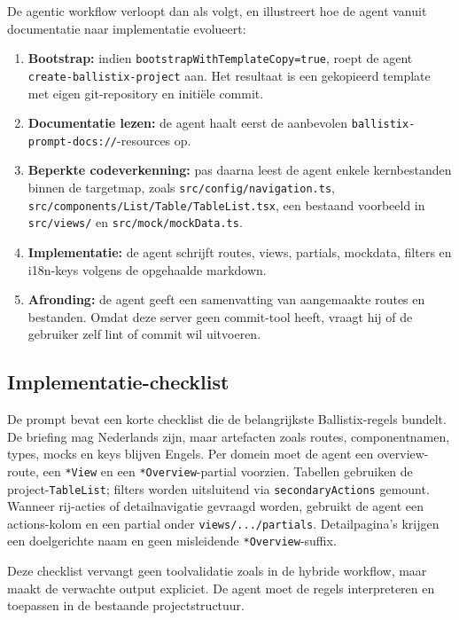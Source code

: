 De agentic workflow verloopt dan als volgt, en illustreert hoe de agent vanuit documentatie naar implementatie evolueert:

\begin{enumerate}
  \item \textbf{Bootstrap:} indien \texttt{bootstrapWithTemplateCopy=true}, roept de agent \texttt{create-ballistix-project} aan. Het resultaat is een gekopieerd template met eigen git-repository en initiële commit.
  \item \textbf{Documentatie lezen:} de agent haalt eerst de aanbevolen \texttt{ballistix-prompt-docs://}-resources op.
  \item \textbf{Beperkte codeverkenning:} pas daarna leest de agent enkele kernbestanden binnen de targetmap, zoals \texttt{src/config/navigation.ts}, \texttt{src/components/List/Table/TableList.tsx}, een bestaand voorbeeld in \texttt{src/views/} en \texttt{src/mock/mockData.ts}.
  \item \textbf{Implementatie:} de agent schrijft routes, views, partials, mockdata, filters en i18n-keys volgens de opgehaalde markdown.
  \item \textbf{Afronding:} de agent geeft een samenvatting van aangemaakte routes en bestanden. Omdat deze server geen commit-tool heeft, vraagt hij of de gebruiker zelf lint of commit wil uitvoeren.
\end{enumerate}

\subsection{Implementatie-checklist}

De prompt bevat een korte checklist die de belangrijkste Ballistix-regels bundelt. De briefing mag Nederlands zijn, maar artefacten zoals routes, componentnamen, types, mocks en keys blijven Engels. Per domein moet de agent een overview-route, een \texttt{*View} en een \texttt{*Overview}-partial voorzien. Tabellen gebruiken de project-\texttt{TableList}; filters worden uitsluitend via \texttt{secondaryActions} gemount. Wanneer rij-acties of detailnavigatie gevraagd worden, gebruikt de agent een actions-kolom en een partial onder \texttt{views/.../partials}. Detailpagina's krijgen een doelgerichte naam en geen misleidende \texttt{*Overview}-suffix.

Deze checklist vervangt geen toolvalidatie zoals in de hybride workflow, maar maakt de verwachte output expliciet. De agent moet de regels interpreteren en toepassen in de bestaande projectstructuur.

